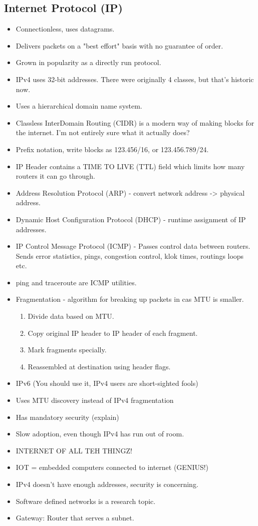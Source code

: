 \documentclass{scrartcl}
\begin{document}
\subsection*{Internet Protocol (IP)}
\begin{itemize}
\item Connectionless, uses datagrams.
\item Delivers packets on a "best effort" basis with no guarantee of order.
\item Grown in popularity as a directly run protocol.
\item IPv4 uses 32-bit addresses. There were originally 4 classes, but that's
 historic now.
\item Uses a hierarchical domain name system.
\item Classless InterDomain Routing (CIDR) is a modern way of making blocks
 for the internet. I'm not entirely sure what it actually does?
\item Prefix notation, write blocks as 123.456/16, or 123.456.789/24.
\item IP Header contains a TIME TO LIVE (TTL) field which limits how many 
 routers it can go through.
\item Address Resolution Protocol (ARP) - convert network address -> physical
 address.
\item Dynamic Host Configuration Protocol (DHCP) - runtime assignment of IP
 addresses.
\item IP Control Message Protocol (ICMP) - Passes control data between routers.
 Sends error statistics, pings, congestion control, klok times, routings loops
 etc.
\item ping and traceroute are ICMP utilities.
\item Fragmentation - algorithm for breaking up packets in cas MTU is smaller.
\begin{enumerate}
\item Divide data based on MTU.
\item Copy original IP header to IP header of each fragment.
\item Mark fragments specially.
\item Reassembled at destination using header flags.
\end{enumerate}
\item IPv6 (You should use it, IPv4 users are short-sighted fools)
\item Uses MTU discovery instead of IPv4 fragmentation
\item Has mandatory security (explain)
\item Slow adoption, even though IPv4 has run out of room.
\item INTERNET OF ALL TEH THINGZ!
\item IOT = embedded computers connected to internet (GENIUS!)
\item IPv4 doesn't have enough addresses, security is concerning.
\item Software defined networks is a research topic.
\item Gateway: Router that serves a subnet.
\end{itemize}
\end{document}
